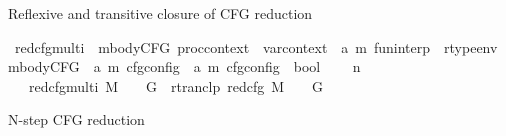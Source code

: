 \begin{isabellebody}
\begin{isamarkuptext}%
Reflexive and transitive closure of CFG reduction%
\end{isamarkuptext}\isamarkuptrue%
\isamarkupfalse%
\ red{\isacharunderscore}{\kern0pt}cfg{\isacharunderscore}{\kern0pt}multi\ {\isacharcolon}{\kern0pt}{\isacharcolon}{\kern0pt}\ {\isachardoublequoteopen}mbodyCFG\ proc{\isacharunderscore}{\kern0pt}context\ {\isasymRightarrow}\ var{\isacharunderscore}{\kern0pt}context\ {\isasymRightarrow}\ {\isacharparenleft}{\kern0pt}{\isacharprime}{\kern0pt}a{\isacharcomma}{\kern0pt}\ {\isacharprime}{\kern0pt}m{\isacharparenright}{\kern0pt}\ fun{\isacharunderscore}{\kern0pt}interp\ {\isasymRightarrow}\ rtype{\isacharunderscore}{\kern0pt}env\ {\isasymRightarrow}\ mbodyCFG\ {\isasymRightarrow}\ {\isacharparenleft}{\kern0pt}{\isacharprime}{\kern0pt}a{\isacharcomma}{\kern0pt}\ {\isacharprime}{\kern0pt}m{\isacharparenright}{\kern0pt}\ cfg{\isacharunderscore}{\kern0pt}config\ {\isasymRightarrow}\ {\isacharparenleft}{\kern0pt}{\isacharprime}{\kern0pt}a{\isacharcomma}{\kern0pt}\ {\isacharprime}{\kern0pt}m{\isacharparenright}{\kern0pt}\ cfg{\isacharunderscore}{\kern0pt}config\ {\isasymRightarrow}\ bool{\isachardoublequoteclose}\isanewline
\ \ {\isacharparenleft}{\kern0pt}{\isachardoublequoteopen}{\isacharunderscore}{\kern0pt}{\isacharcomma}{\kern0pt}{\isacharunderscore}{\kern0pt}{\isacharcomma}{\kern0pt}{\isacharunderscore}{\kern0pt}{\isacharcomma}{\kern0pt}{\isacharunderscore}{\kern0pt}{\isacharcomma}{\kern0pt}{\isacharunderscore}{\kern0pt}\ {\isasymturnstile}{\isacharunderscore}{\kern0pt}\ {\isacharminus}{\kern0pt}n{\isasymrightarrow}{\isacharasterisk}{\kern0pt}{\isacharslash}{\kern0pt}\ {\isacharunderscore}{\kern0pt}{\isachardoublequoteclose}\ {\isacharbrackleft}{\kern0pt}{}{\isacharcomma}{\kern0pt}{}{\isacharcomma}{\kern0pt}{}{\isacharbrackright}{\kern0pt}\ {}{}{\isacharparenright}{\kern0pt}\isanewline
\ \ \ {\isachardoublequoteopen}red{\isacharunderscore}{\kern0pt}cfg{\isacharunderscore}{\kern0pt}multi\ M\ {\isasymLambda}\ {\isasymGamma}\ {\isasymOmega}\ G\ {\isasymequiv}\ rtranclp\ {\isacharparenleft}{\kern0pt}red{\isacharunderscore}{\kern0pt}cfg\ M\ {\isasymLambda}\ {\isasymGamma}\ {\isasymOmega}\ G{\isacharparenright}{\kern0pt}{\isachardoublequoteclose}%
\begin{isamarkuptext}%
N-step CFG reduction%
\end{isamarkuptext}\isamarkuptrue%
\isamarkupfalse%

\end{isabellebody}
